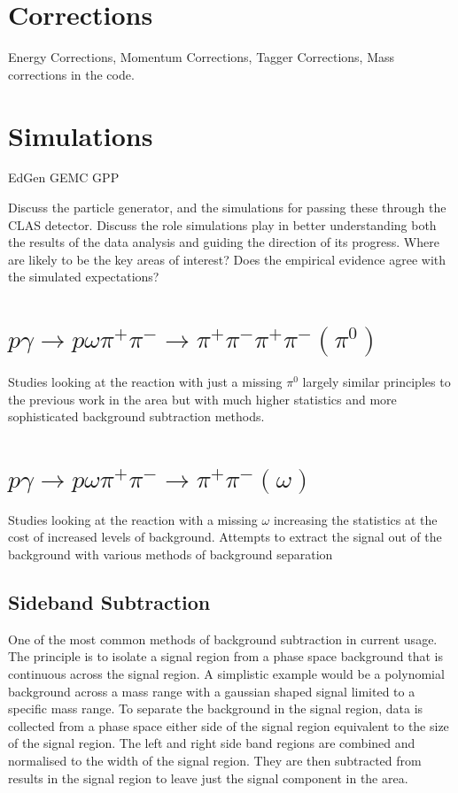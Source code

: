 \section{Corrections}
Energy Corrections, Momentum Corrections, Tagger Corrections, Mass corrections in the code.
\section{Simulations}
EdGen
GEMC
GPP

Discuss the particle generator, and the simulations for passing these through the CLAS detector.
Discuss the role simulations play in better understanding both the results of the data analysis and guiding the direction of its progress. Where are likely to be the key areas of interest? Does the empirical evidence agree with the simulated expectations?


\section{$p\gamma \rightarrow p\omega\pi^{+}\pi^{-} \rightarrow \pi^{+}\pi^{-}\pi^{+}\pi^{-}(\pi^{0})$}
Studies looking at the reaction with just a missing $\pi^{0}$ largely similar principles to the previous work in the area but with much higher statistics and more sophisticated background subtraction methods.
\section{$p\gamma \rightarrow p\omega\pi^{+}\pi^{-} \rightarrow \pi^{+}\pi^{-}(\omega)$}
Studies looking at the reaction with a missing $\omega$ increasing the statistics at the cost of increased levels of background.
Attempts to extract the signal out of the background with various methods of background separation

\subsection{Sideband Subtraction}

One of the most common methods of background subtraction in current usage. The principle is to isolate a signal region from a phase space background that is continuous across the signal region. A simplistic example would be a polynomial background across a mass range with a gaussian shaped signal limited to a specific mass range. To separate the background in the signal region, data is collected from a phase space either side of the signal region equivalent to the size of the signal region. The left and right side band regions are combined and normalised to the width of the signal region. They are then subtracted from results in the signal region to leave just the signal component in the area.

